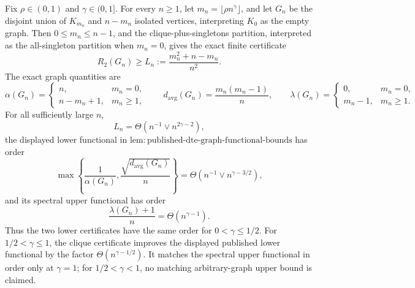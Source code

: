 Fix \(\rho\in(0,1)\) and \(\gamma\in(0,1]\).  For every \(n\geq1\), let \(m_n=\lfloor\rho n^{\gamma}\rfloor\), and let \(G_n\) be the disjoint union of \(K_{m_n}\) and \(n-m_n\) isolated vertices, interpreting \(K_0\) as the empty graph.  Then \(0\leq m_n\leq n-1\), and the clique-plus-singletons partition, interpreted as the all-singleton partition when \(m_n=0\), gives the exact finite certificate
\[
R_2(G_n)\geq L_n:=\frac{m_n^2+n-m_n}{n^2}.
\]
The exact graph quantities are
\[
\alpha(G_n)=
\begin{cases}
n,&m_n=0,\\
n-m_n+1,&m_n\geq1,
\end{cases}
\qquad
d_{\mathrm{avg}}(G_n)=\frac{m_n(m_n-1)}n,
\qquad
\lambda(G_n)=
\begin{cases}
0,&m_n=0,\\
m_n-1,&m_n\geq1.
\end{cases}
\]
For all sufficiently large \(n\),
\[
L_n=\Theta\!\left(n^{-1}\vee n^{2\gamma-2}\right),
\]
the displayed lower functional in \(\mathrm{lem{:}published\text{-}dte\text{-}graph\text{-}functional\text{-}bounds}\) has order
\[
\max\left\{\frac1{\alpha(G_n)},\frac{\sqrt{d_{\mathrm{avg}}(G_n)}}n\right\}
=\Theta\!\left(n^{-1}\vee n^{\gamma-3/2}\right),
\]
and its spectral upper functional has order
\[
\frac{\lambda(G_n)+1}{n}=\Theta\!\left(n^{\gamma-1}\right).
\]
Thus the two lower certificates have the same order for \(0<\gamma\leq1/2\).  For \(1/2<\gamma\leq1\), the clique certificate improves the displayed published lower functional by the factor \(\Theta(n^{\gamma-1/2})\).  It matches the spectral upper functional in order only at \(\gamma=1\); for \(1/2<\gamma<1\), no matching arbitrary-graph upper bound is claimed.